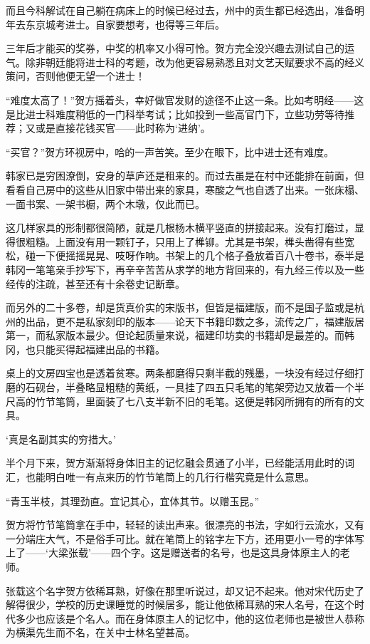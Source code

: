 而且今科解试在自己躺在病床上的时候已经过去，州中的贡生都已经选出，准备明年去东京城考进士。自家要想考，也得等三年后。

三年后才能买的奖券，中奖的机率又小得可怜。贺方完全没兴趣去测试自己的运气。除非朝廷能将进士科的考题，改为他更容易熟悉且对文艺天赋要求不高的经义策问，否则他便无望一个进士！

“难度太高了！”贺方摇着头，幸好做官发财的途径不止这一条。比如考明经——这是比进士科难度稍低的一门科举考试；比如投到一些高官门下，立些功劳等待推荐；又或是直接花钱买官——此时称为‘进纳’。

“买官？”贺方环视房中，哈的一声苦笑。至少在眼下，比中进士还有难度。

韩家已是穷困潦倒，安身的草庐还是租来的。而过去虽是在村中还能排在前面，但看看自己房中的这些从旧家中带出来的家具，寒酸之气也自透了出来。一张床榻、一面书案、一架书橱，两个木墩，仅此而已。

这几样家具的形制都很简陋，就是几根杨木横平竖直的拼接起来。没有打磨过，显得很粗糙。上面没有用一颗钉子，只用上了榫铆。尤其是书架，榫头凿得有些宽松，碰一下便摇摇晃晃、吱呀作响。书架上的几个格子叠放着百八十卷书，泰半是韩冈一笔笔亲手抄写下，再辛辛苦苦从求学的地方背回来的，有九经三传以及一些经传的注疏，甚至还有十余卷史记断章。

而另外的二十多卷，却是货真价实的宋版书，但皆是福建版，而不是国子监或是杭州的出品，更不是私家刻印的版本——论天下书籍印数之多，流传之广，福建版居第一，而私家版本最少。但论起质量来说，福建印坊卖的书籍却是最差的。而韩冈，也只能买得起福建出品的书籍。

桌上的文房四宝也是透着贫寒。两条都磨得只剩半截的残墨，一块没有经过仔细打磨的石砚台，半叠略显粗糙的黄纸，一具挂了四五只毛笔的笔架旁边又放着一个半尺高的竹节笔筒，里面装了七八支半新不旧的毛笔。这便是韩冈所拥有的所有的文具。

‘真是名副其实的穷措大。’

半个月下来，贺方渐渐将身体旧主的记忆融会贯通了小半，已经能活用此时的词汇，也能明白唯一有点来历的竹节笔筒上的几行行楷究竟是什么意思。

“青玉半枝，其理劲直。宜记其心，宜体其节。以赠玉昆。”

贺方将竹节笔筒拿在手中，轻轻的读出声来。很漂亮的书法，字如行云流水，又有一分端庄大气，不是俗手可比。就在笔筒上的铭字左下方，还用更小一号的字体写上了——‘大梁张载’——四个字。这是赠送者的名号，也是这具身体原主人的老师。

张载这个名字贺方依稀耳熟，好像在那里听说过，却又记不起来。他对宋代历史了解得很少，学校的历史课睡觉的时候居多，能让他依稀耳熟的宋人名号，在这个时代多少也应该是个名人。而在身体原主人的记忆中，他的这位老师也是被世人恭称为横渠先生而不名，在关中士林名望甚高。


